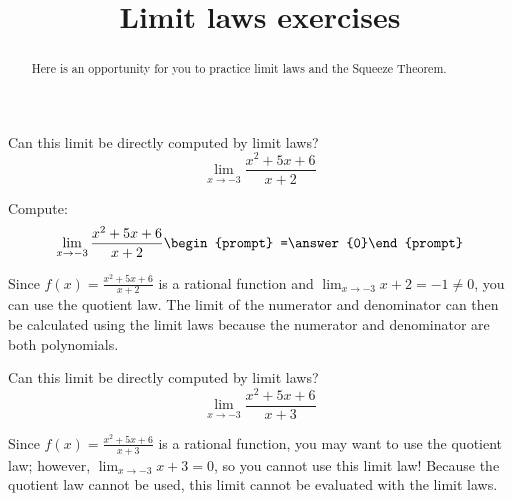 \documentclass[handout]{ximera}
\title{Limit laws exercises}
\begin{document}
\begin{abstract}
Here is an opportunity for you to practice limit laws and the Squeeze Theorem.
\end{abstract}
\maketitle

\begin{exercise}
  Can this limit be directly computed by limit laws?
  \[
  \displaystyle\lim_{x\to -3}\frac{x^2+5x+6}{x+2} 
  \]
  \begin{multipleChoice}
  \end{multipleChoice}
  \begin{question}
    Compute:
    \[
    \displaystyle\lim_{x\to -3}\frac{x^2+5x+6}{x+2} \begin{prompt} =\answer{0}\end{prompt}
    \]
    \begin{feedback}
      Since $f(x)=\frac{x^2+5x+6}{x+2}$ is a rational function and
      $\displaystyle\lim_{x\to -3} x+2 =-1 \neq 0$, you can use the quotient law.  The limit of the numerator and denominator can then be calculated using the limit laws because the numerator and denominator are both polynomials. 
    \end{feedback}
  \end{question}
\end{exercise}

\begin{exercise}
  Can this limit be directly computed by limit laws?
  \[
  \displaystyle\lim_{x\to -3}\frac{x^2+5x+6}{x+3} 
  \]
  \begin{multipleChoice}
    
    \begin{feedback}[correct]
      Since $f(x)=\frac{x^2+5x+6}{x+3}$ is a rational function, you may want to use the quotient law; however, $\displaystyle\lim_{x\to -3} x+3 = 0$, so you cannot use this limit law!  Because the quotient law cannot be used, this limit cannot be evaluated with the limit laws. 
    \end{feedback}
    
  \end{multipleChoice}

\end{exercise}
\end{document}
